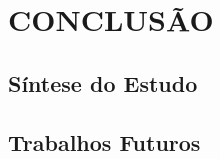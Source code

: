 \chapter{CONCLUSÃO}
\label{cap:conclusao}

\section{Síntese do Estudo}
\label{sec:sintese}

\section{Trabalhos Futuros}
\label{sec:trabalhos-futuros}

\glsaddall